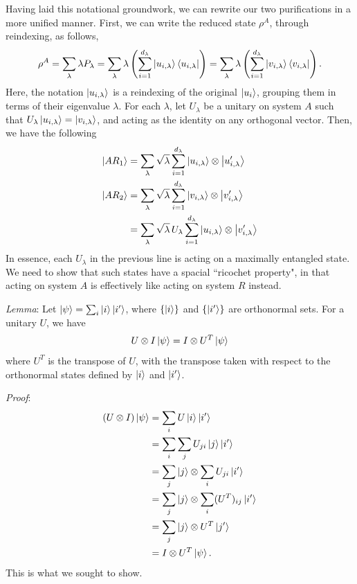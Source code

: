 \documentclass{book}
\begin{document}
    Having laid this notational groundwork, we can rewrite our two purifications in a more unified manner. First, we can write the reduced state $\rho^A$, through reindexing, as follows,
    \begin{align}
        \rho^A = \sum_{\lambda} \lambda P_\lambda = \sum_{\lambda} \lambda \left(\sum_{i=1}^{d_\lambda} \ket{u_{i,\lambda}}\bra{u_{i,\lambda}}\right) = \sum_{\lambda} \lambda \left(\sum_{i=1}^{d_\lambda} \ket{v_{i,\lambda}}\bra{v_{i,\lambda}}\right).
    \end{align}
    Here, the notation $\ket{u_{i,\lambda}}$ is a reindexing of the original $\ket{u_i}$, grouping them in terms of their eigenvalue $\lambda$. For each $\lambda$, let $U_\lambda$ be a unitary on system $A$ such that $U_\lambda \ket{u_{i,\lambda}} = \ket{v_{i,\lambda}}$, and acting as the identity on any orthogonal vector. Then, we have the following 
    \begin{align} \label{eq:2.81_local_U}
    \begin{aligned}
        \ket{A R_1} &= \sum_\lambda \sqrt{\lambda} \sum_{i=1}^{d_\lambda} \ket{u_{i,\lambda }}\otimes \ket{u_{i,\lambda}'} \\
        \ket{A R_2} &= \sum_\lambda \sqrt{\lambda} \sum_{i=1}^{d_\lambda}\ket{v_{i,\lambda}}\otimes \ket{v_{i,\lambda}'} \\
        &= \sum_\lambda \sqrt{\lambda} \, U_\lambda \sum_{i=1}^{d_\lambda}\ket{u_{i,\lambda}}\otimes \ket{v_{i,\lambda}'}
    \end{aligned}
    \end{align}
    In essence, each $U_\lambda$ in the previous line is acting on a maximally entangled state. We need to show that such states have a spacial ``ricochet property", in that acting on system $A$ is effectively like acting on system $R$ instead.

    \emph{Lemma}: Let $\ket{\psi} = \sum_i \ket{i}\ket{i'}$, where $\{\ket{i}\}$ and $\{\ket{i'}\}$ are orthonormal sets. For a unitary $U$, we have
    \begin{align}
        U \otimes I \ket{\psi} = I \otimes U^T \ket{\psi}
    \end{align}
    where $U^T$ is the transpose of $U$, with the transpose taken with respect to the orthonormal states defined by $\ket{i}$ and $\ket{i'}$. 

    \emph{Proof}: 
    \begin{align}
    \begin{aligned}
        (U \otimes I) \ket{\psi} &= \sum_i U \ket{i}\ket{i'} \\
        &= \sum_{i}\sum_j U_{ji} \ket{j}\ket{i'} \\
        &= \sum_j \ket{j} \otimes \sum_i U_{ji} \ket{i'} \\
        &= \sum_j \ket{j} \otimes \sum_i (U^T)_{ij} \ket{i'} \\
        &= \sum_j \ket{j} \otimes U^T \ket{j'} \\
        &= I \otimes U^T \ket{\psi}.
    \end{aligned}
    \end{align}
    This is what we sought to show.
\end{document}
